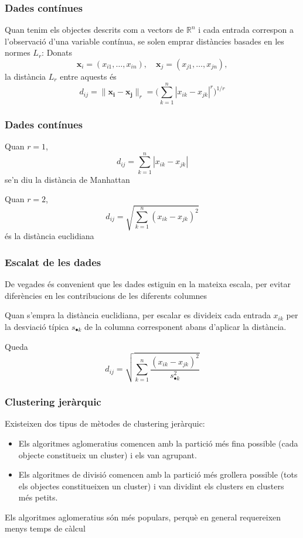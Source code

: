 \documentclass[12pt,t]{beamer}
\renewcommand{\emph}[1]{{\color{red}#1}}
\newcommand{\RR}{\mathbb{R}}
\theoremstyle{plain}
\theoremstyle{definition}
\begin{document}
\begin{frame}
\frametitle{Dades contínues}
Quan tenim els objectes descrits com a vectors de $\RR^n$ i cada entrada correspon a l'observació d'una variable contínua, se solen emprar \emph{distàncies} basades en les \emph{normes $L_r$}: Donats
$$
\mathbf{x}_i=(x_{i1},\ldots,x_{in}),\quad \mathbf{x}_j=(x_{j1},\ldots,x_{jn}),
$$
la \emph{distància $L_r$} entre aquests és
$$
d_{ij}=\|\mathbf{x_i} - \mathbf{x_j}\|_r = \Big(\sum_{k=1}^n |x_{ik} - x_{jk}|^r\Big)^{1/r}
$$
\end{frame}


\begin{frame}
\frametitle{Dades contínues}
Quan $r=1$,
$$
d_{ij}= \sum_{k=1}^n |x_{ik} - x_{jk}|
$$
se'n diu la \emph{distància de Manhattan}
\medskip

Quan $r=2$,
$$
d_{ij}= \sqrt{\sum_{k=1}^n (x_{ik} - x_{jk})^2}
$$
és la \emph{distància euclidiana}
\end{frame}

\begin{frame}
\frametitle{Escalat de les dades}
De vegades és convenient que les dades estiguin en la mateixa escala, per evitar diferències en les contribucions de les diferents columnes 
\medskip

Quan s'empra la distància euclidiana, per escalar es divideix cada entrada $x_{ik}$ per la desviació típica $s_{\bullet k}$ de la  columna corresponent abans d'aplicar la distància.
\medskip

Queda
$$
d_{ij}= \sqrt{\sum_{k=1}^n \frac{(x_{ik} - x_{jk})^2}{s^2_{\bullet k}}}
$$
\end{frame}

\begin{frame}
\frametitle{Clustering jeràrquic}

Existeixen dos tipus de mètodes de clustering jeràrquic: 
\begin{itemize}
\item Els \emph{algoritmes aglomeratius} comencen amb la partició més fina possible (cada objecte constitueix un cluster) i els van agrupant.
\medskip

\item Els \emph{algoritmes de divisió} comencen amb la partició més grollera possible (tots els objectes constitueixen un cluster) i van dividint els clusters en clusters més petits.
\end{itemize}
\medskip

Els algoritmes aglomeratius són més populars, perquè en general requereixen menys temps de càlcul
\end{frame}
\end{document}
